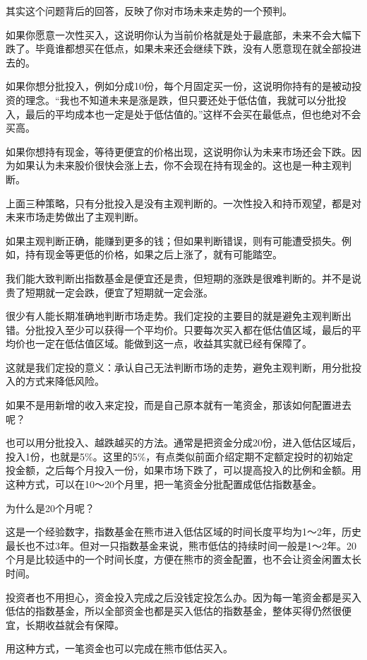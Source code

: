 其实这个问题背后的回答，反映了你对市场未来走势的一个预判。

如果你愿意一次性买入，这说明你认为当前价格就是处于最底部，未来不会大幅下跌了。毕竟谁都想买在低点，如果未来还会继续下跌，没有人愿意现在就全部投进去的。

如果你想分批投入，例如分成10份，每个月固定买一份，这说明你持有的是被动投资的理念。“我也不知道未来是涨是跌，但只要还处于低估值，我就可以分批投入，最后的平均成本也一定是处于低估值的。”这样不会买在最低点，但也绝对不会买高。

如果你想持有现金，等待更便宜的价格出现，这说明你认为未来市场还会下跌。因为如果认为未来股价很快会涨上去，你不会现在持有现金的。这也是一种主观判断。

上面三种策略，只有分批投入是没有主观判断的。一次性投入和持币观望，都是对未来市场走势做出了主观判断。

如果主观判断正确，能赚到更多的钱；但如果判断错误，则有可能遭受损失。例如，持有现金等更低的价格，如果之后上涨了，就有可能踏空。

我们能大致判断出指数基金是便宜还是贵，但短期的涨跌是很难判断的。并不是说贵了短期就一定会跌，便宜了短期就一定会涨。

很少有人能长期准确地判断市场走势。我们定投的主要目的就是避免主观判断出错。分批投入至少可以获得一个平均价。只要每次买入都在低估值区域，最后的平均价也一定在低估值区域。能做到这一点，收益其实就已经有保障了。

这就是我们定投的意义：承认自己无法判断市场的走势，避免主观判断，用分批投入的方式来降低风险。

如果不是用新增的收入来定投，而是自己原本就有一笔资金，那该如何配置进去呢？

也可以用分批投入、越跌越买的方法。通常是把资金分成20份，进入低估区域后，投入1份，也就是5\%。这里的5\%，有点类似前面介绍定期不定额定投时的初始定投金额，之后每个月投入一份，如果市场下跌了，可以提高投入的比例和金额。用这种方式，可以在10～20个月里，把一笔资金分批配置成低估指数基金。

为什么是20个月呢？

这是一个经验数字，指数基金在熊市进入低估区域的时间长度平均为1～2年，历史最长也不过3年。但对一只指数基金来说，熊市低估的持续时间一般是1～2年。20个月是比较适中的一个时间长度，方便在熊市的资金配置，也不会让资金闲置太长时间。

投资者也不用担心，资金投入完成之后没钱定投怎么办。因为每一笔资金都是买入低估的指数基金，所以全部资金也都是买入低估的指数基金，整体买得仍然很便宜，长期收益就会有保障。

用这种方式，一笔资金也可以完成在熊市低估买入。


